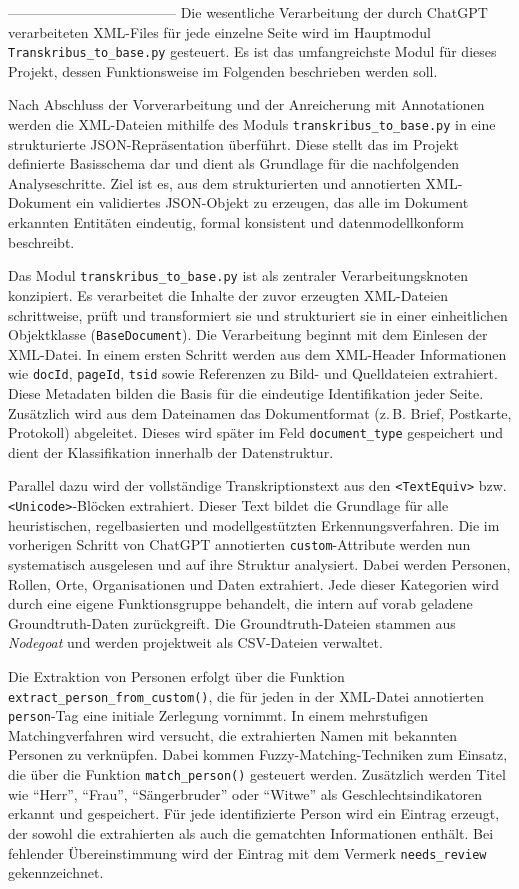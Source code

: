 \documentclass[12pt, a4paper, ngerman, bidi=default]{article}
\newcommand{\code}[1]{\colorbox{VeryLightGray}{\texttt{#1}}} %
\begin{document}
------------------------------------
Die wesentliche Verarbeitung der durch ChatGPT verarbeiteten XML-Files für jede einzelne Seite wird im 
Hauptmodul \code{Transkribus\_to\_base.py} gesteuert. Es ist das umfangreichste
Modul für dieses Projekt, dessen Funktionsweise im Folgenden beschrieben werden soll.

Nach Abschluss der Vorverarbeitung und der Anreicherung mit Annotationen werden die XML-Dateien mithilfe des 
Moduls \texttt{transkribus\_to\_base.py} in eine strukturierte JSON-Repräsentation überführt. Diese stellt das 
im Projekt definierte Basisschema dar und dient als Grundlage für die nachfolgenden Analyseschritte. Ziel ist es, 
aus dem strukturierten und annotierten XML-Dokument ein validiertes JSON-Objekt zu erzeugen, das alle im Dokument 
erkannten Entitäten eindeutig, formal konsistent und datenmodellkonform beschreibt.

Das Modul \code{transkribus\_to\_base.py} ist als zentraler Verarbeitungsknoten konzipiert. Es verarbeitet die Inhalte 
der zuvor erzeugten XML-Dateien schrittweise, prüft und transformiert sie und strukturiert sie in einer einheitlichen Objektklasse 
(\code{BaseDocument}). Die Verarbeitung beginnt mit dem Einlesen der XML-Datei. In einem ersten Schritt werden aus dem XML-Header 
Informationen wie \code{docId}, \code{pageId}, \code{tsid} sowie Referenzen zu Bild- und Quelldateien extrahiert. Diese Metadaten 
bilden die Basis für die eindeutige Identifikation jeder Seite. Zusätzlich wird aus dem Dateinamen das Dokumentformat (z.\,B. Brief, 
Postkarte, Protokoll) abgeleitet. Dieses wird später im Feld \code{document\_type} gespeichert und dient der Klassifikation innerhalb 
der Datenstruktur.

Parallel dazu wird der vollständige Transkriptionstext aus den \code{<TextEquiv>} bzw. \code{<Unicode>}-Blöcken extrahiert. Dieser 
Text bildet die Grundlage für alle heuristischen, regelbasierten und modellgestützten Erkennungsverfahren. Die im vorherigen Schritt von 
ChatGPT annotierten \code{custom}-Attribute werden nun systematisch ausgelesen und auf ihre Struktur analysiert. Dabei werden Personen, 
Rollen, Orte, Organisationen und Daten extrahiert. Jede dieser Kategorien wird durch eine eigene Funktionsgruppe behandelt, die intern auf 
vorab geladene Groundtruth-Daten zurückgreift. Die Groundtruth-Dateien stammen aus \textit{Nodegoat} und werden projektweit als 
CSV-Dateien verwaltet.

Die Extraktion von Personen erfolgt über die Funktion \code{extract\_person\_from\_custom()}, die für jeden in der XML-Datei 
annotierten \code{person}-Tag eine initiale Zerlegung vornimmt. In einem mehrstufigen Matchingverfahren wird versucht, die 
extrahierten Namen mit bekannten Personen zu verknüpfen. Dabei kommen Fuzzy-Matching-Techniken zum Einsatz, die über die Funktion 
\code{match\_person()} gesteuert werden. Zusätzlich werden Titel wie \enquote{Herr}, \enquote{Frau}, \enquote{Sängerbruder} oder 
\enquote{Witwe} als Geschlechtsindikatoren erkannt und gespeichert. Für jede identifizierte Person wird ein Eintrag erzeugt, der sowohl 
die extrahierten als auch die gematchten Informationen enthält. Bei fehlender Übereinstimmung wird der Eintrag mit dem Vermerk 
\code{needs\_review} gekennzeichnet.
\end{document}
